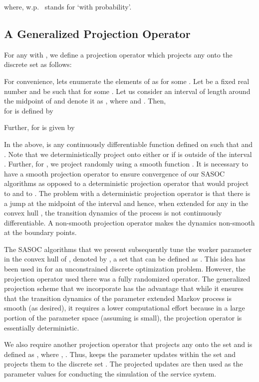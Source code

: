 \documentclass[11pt,letterpaper,english]{article}
\begin{document}
where, w.p.~ stands for `with probability'.

\subsection{A Generalized Projection Operator}
\label{sec:gammaproj}
For any  with , we define a projection operator
 which projects any  onto the discrete set  as follows:

For convenience, lets enumerate the elements of  as
 for some .
Let  be a fixed real number and  be such that  for some .
Let us consider an interval of length  around the midpoint of  and denote it as , where  and .
 Then, \\ for  is defined by

Further,  for  is
given by

In the above,  is any continuously
differentiable function defined on  such that  and . Note
that we deterministically project onto either  or  if
 is outside of the interval . Further,
for , we project randomly using a
smooth function . It is necessary to have a smooth projection operator to
ensure convergence of our SASOC algorithms as opposed to a deterministic
projection operator that would project  to  and  to . The problem with a
deterministic projection operator is that there is a jump at the midpoint of the interval and hence, when
extended for any  in the convex hull , the transition dynamics
of the process   is not continuously
differentiable. A non-smooth projection operator makes the dynamics non-smooth at the boundary
points.

The SASOC algorithms that we present subsequently tune the worker parameter in
the convex hull of , denoted by , a set that can be defined as
. This idea has been used in
\citep{shalabh2011stochastic} for an unconstrained discrete
optimization
problem. However, the projection operator used there was a fully randomized
operator. The generalized projection scheme that we incorporate has the
advantage that while it ensures that the transition dynamics of the parameter
extended Markov process is smooth (as desired), it requires a lower
computational effort because in a large portion of the parameter space (assuming
 is small), the projection operator is essentially deterministic.

We also require another projection operator  that projects any
 onto the set  and is defined as , where
, .
Thus,  keeps the parameter updates within the set 
and  projects them to the discrete set . The projected
updates are then used as the parameter values for conducting the simulation of
the service system.
\end{document}
